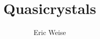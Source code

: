 \documentclass{article}
\title{Quasicrystals}
\author{Eric Weise}
\date{}
\begin{document}
\maketitle

\begin{abstract}
\end{abstract}

\begin{multicols}{2}

    
    
    
    
    

    

\end{multicols}
\end{document}

